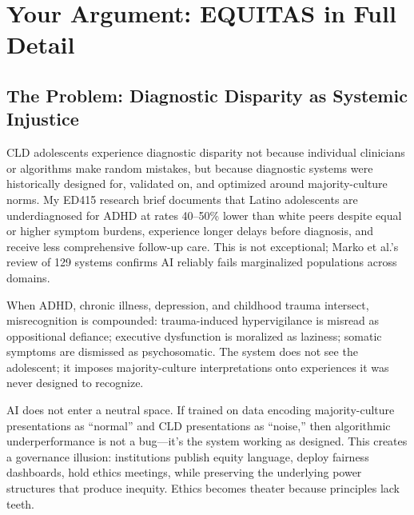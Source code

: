 \documentclass[12pt,a4paper]{article}
\begin{document}
\section{Your Argument: EQUITAS in Full Detail}

\begin{tcolorbox}[colback=questionbg,colframe=questionborder,title=\textbf{GUIDING QUESTION:} In full detail, what's your ethical argument?]
\end{tcolorbox}

\subsection{The Problem: Diagnostic Disparity as Systemic Injustice}

CLD adolescents experience diagnostic disparity not because individual clinicians or algorithms make random mistakes, but because diagnostic systems were historically designed for, validated on, and optimized around majority-culture norms. My ED415 research brief documents that Latino adolescents are underdiagnosed for ADHD at rates 40--50\% lower than white peers despite equal or higher symptom burdens, experience longer delays before diagnosis, and receive less comprehensive follow-up care.\cite{garcia_ed415} This is not exceptional; Marko et al.'s review of 129 systems confirms AI reliably fails marginalized populations across domains.\cite{marko2025}

When ADHD, chronic illness, depression, and childhood trauma intersect, misrecognition is compounded: trauma-induced hypervigilance is misread as oppositional defiance; executive dysfunction is moralized as laziness; somatic symptoms are dismissed as psychosomatic. The system does not see the adolescent; it imposes majority-culture interpretations onto experiences it was never designed to recognize.

AI does not enter a neutral space. If trained on data encoding majority-culture presentations as ``normal'' and CLD presentations as ``noise,'' then algorithmic underperformance is not a bug—it's the system working as designed. This creates a governance illusion: institutions publish equity language, deploy fairness dashboards, hold ethics meetings, while preserving the underlying power structures that produce inequity. Ethics becomes theater because principles lack teeth.
\end{document}
